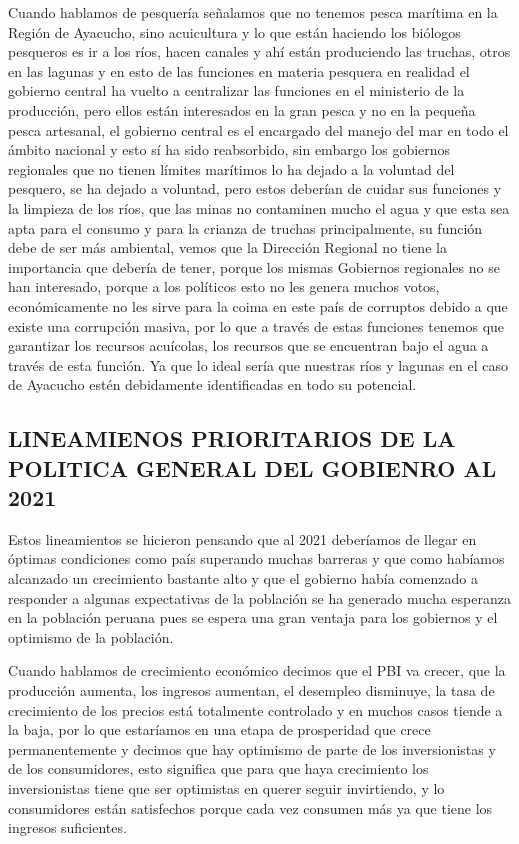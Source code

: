 \documentclass[
  a4paper,
]{article}
\begin{document}
Cuando hablamos de pesquería señalamos que no tenemos pesca marítima en
la Región de Ayacucho, sino acuicultura y lo que están haciendo los
biólogos pesqueros es ir a los ríos, hacen canales y ahí están
produciendo las truchas, otros en las lagunas y en esto de las funciones
en materia pesquera en realidad el gobierno central ha vuelto a
centralizar las funciones en el ministerio de la producción, pero ellos
están interesados en la gran pesca y no en la pequeña pesca artesanal,
el gobierno central es el encargado del manejo del mar en todo el ámbito
nacional y esto sí ha sido reabsorbido, sin embargo los gobiernos
regionales que no tienen límites marítimos lo ha dejado a la voluntad
del pesquero, se ha dejado a voluntad, pero estos deberían de cuidar sus
funciones y la limpieza de los ríos, que las minas no contaminen mucho
el agua y que esta sea apta para el consumo y para la crianza de truchas
principalmente, su función debe de ser más ambiental, vemos que la
Dirección Regional no tiene la importancia que debería de tener, porque
los mismas Gobiernos regionales no se han interesado, porque a los
políticos esto no les genera muchos votos, económicamente no les sirve
para la coima en este país de corruptos debido a que existe una
corrupción masiva, por lo que a través de estas funciones tenemos que
garantizar los recursos acuícolas, los recursos que se encuentran bajo
el agua a través de esta función. Ya que lo ideal sería que nuestras
ríos y lagunas en el caso de Ayacucho estén debidamente identificadas en
todo su potencial.

\hypertarget{lineamienos-prioritarios-de-la-politica-general-del-gobienro-al-2021}{%
\subsection{LINEAMIENOS PRIORITARIOS DE LA POLITICA GENERAL DEL GOBIENRO
AL
2021}\label{lineamienos-prioritarios-de-la-politica-general-del-gobienro-al-2021}}

Estos lineamientos se hicieron pensando que al 2021 deberíamos de llegar
en óptimas condiciones como país superando muchas barreras y que como
habíamos alcanzado un crecimiento bastante alto y que el gobierno había
comenzado a responder a algunas expectativas de la población se ha
generado mucha esperanza en la población peruana pues se espera una gran
ventaja para los gobiernos y el optimismo de la población.

Cuando hablamos de crecimiento económico decimos que el PBI va crecer,
que la producción aumenta, los ingresos aumentan, el desempleo
disminuye, la tasa de crecimiento de los precios está totalmente
controlado y en muchos casos tiende a la baja, por lo que estaríamos en
una etapa de prosperidad que crece permanentemente y decimos que hay
optimismo de parte de los inversionistas y de los consumidores, esto
significa que para que haya crecimiento los inversionistas tiene que ser
optimistas en querer seguir invirtiendo, y lo consumidores están
satisfechos porque cada vez consumen más ya que tiene los ingresos
suficientes.
\end{document}
